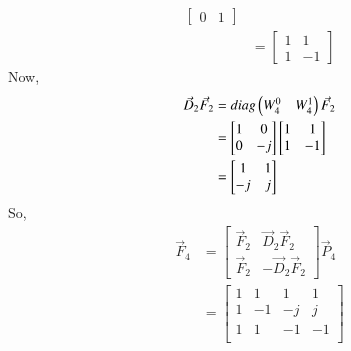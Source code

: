 \documentclass[journal,12pt,twocolumn]{IEEEtran}
\renewcommand\thesection{\arabic{section}}
\begin{document}
\begin{enumerate}[label=\arabic*.,ref=\thesection.\theenumi]
\begin{align}
\begin{bmatrix}
                     0 & 1
                \end{bmatrix}                                     \\
                          & =\begin{bmatrix}
                                  1 & 1  \\
                                  1 & -1
                             \end{bmatrix}
           \end{align}
           Now,
           \begin{align}
                \vec{D}_{2}\vec{F}_{2} & =diag\begin{pmatrix}W_{4}^{0} & W_{4}^{1}\end{pmatrix}\vec{F}_{2} \\
                                       & =\begin{bmatrix}
                                               1 & 0  \\
                                               0 & -j
                                          \end{bmatrix}
                \begin{bmatrix}
                     1 & 1  \\
                     1 & -1
                \end{bmatrix}                                                         \\
                                       & =\begin{bmatrix}
                                               1  & 1 \\
                                               -j & j
                                          \end{bmatrix}
           \end{align}
           So,
           \begin{align}
                \vec{F}_4 & =\begin{bmatrix}
                                  \vec{F}_{2} & \vec{D}_{2}\vec{F}_{2}  \\
                                  \vec{F}_{2} & -\vec{D}_{2}\vec{F}_{2}
                             \end{bmatrix}\vec{P}_4 \\
                          & =\begin{bmatrix}
                                  1 & 1  & 1  & 1  \\
                                  1 & -1 & -j & j  \\
                                  1 & 1  & -1 & -1 \\

\end{bmatrix}
\end{align}
\end{enumerate}
\end{document}
